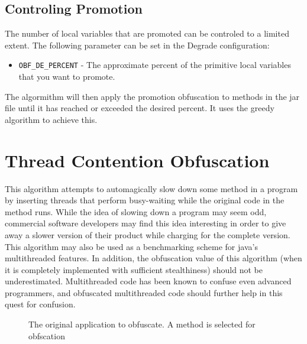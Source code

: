 \newpage
\subsection{Controling Promotion}
The number of local variables that are promoted can be controled to
a limited extent. The following parameter can be set in the Degrade
configuration:
\begin{itemize} 
  \item \texttt{OBF\_DE\_PERCENT} - The approximate percent of the
    primitive local variables that you want to promote.
\end{itemize} 
The algormithm will then apply the promotion obfuscation to methods
in the jar file until it has reached or exceeded the desired percent.
It uses the greedy algorithm to achieve this.

\newpage
\section{Thread Contention Obfuscation}

This algorithm attempts to automagically slow down some method in a program
by inserting threads that perform busy-waiting while the original code in the
method runs.  While the idea of slowing down a program may seem odd, commercial
software developers may find this idea interesting in order to give away a
slower version of their product while charging for the complete version.  This
algorithm may also be used as a benchmarking scheme for java's multithreaded
features.  In
addition, the obfuscation value of this algorithm (when it is completely
implemented with sufficient stealthiness) should not be underestimated.
Multithreaded code has been known to confuse even advanced programmers, and
obfuscated multithreaded code should further help in this quest for confusion.


\begin{figure}
\begin{center}
\end{center}
\caption{The original application to obfuscate.  A method is selected for
obfscation}
\end{figure}

